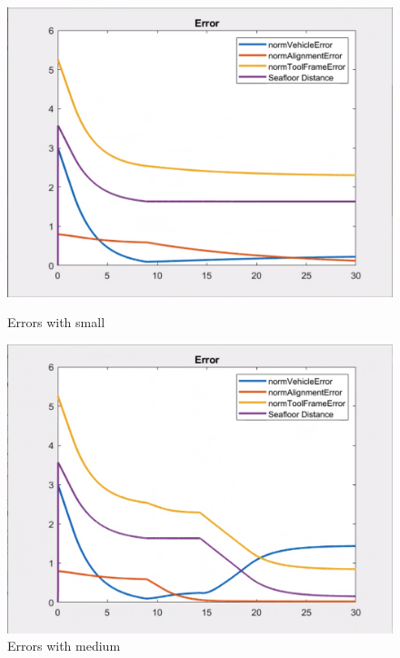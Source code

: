 \documentclass{article}
\begin{document}
\begin{figure}[htpb] 
\begin{minipage}{0.40\textwidth}  
\includegraphics[width=\textwidth]{313_s_Errors.png}
\caption{Errors with small}\label{err_w_s} 
\end{minipage}  
\hspace{0.2\textwidth} 
\begin{minipage}{0.40\textwidth}  
\includegraphics[width=\textwidth]{313_m_Errors.png}
\caption{Errors with medium}\label{err_w_m} 
\end{minipage} 
\hspace{0.2\textwidth} 
\begin{minipage}{0.40\textwidth}  

\end{minipage}
\end{figure}
\end{document}
